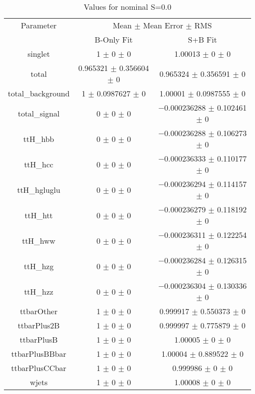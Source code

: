 \begin{table}
\centering
\caption{Values for nominal S=0.0}
\begin{tabular}{ccc}
\toprule
Parameter & \multicolumn{2}{c}{Mean $\pm$ Mean Error $\pm$ RMS}\\
 & B-Only Fit & S+B Fit\\
\midrule
singlet & \num{1} $\pm$ \num{0} $\pm$ \num{0} & \num{1.00013} $\pm$ \num{0} $\pm$ \num{0}\\
total & \num{0.965321} $\pm$ \num{0.356604} $\pm$ \num{0} & \num{0.965324} $\pm$ \num{0.356591} $\pm$ \num{0}\\
total\_background & \num{1} $\pm$ \num{0.0987627} $\pm$ \num{0} & \num{1.00001} $\pm$ \num{0.0987555} $\pm$ \num{0}\\
total\_signal & \num{0} $\pm$ \num{0} $\pm$ \num{0} & \num{-0.000236288} $\pm$ \num{0.102461} $\pm$ \num{0}\\
ttH\_hbb & \num{0} $\pm$ \num{0} $\pm$ \num{0} & \num{-0.000236288} $\pm$ \num{0.106273} $\pm$ \num{0}\\
ttH\_hcc & \num{0} $\pm$ \num{0} $\pm$ \num{0} & \num{-0.000236333} $\pm$ \num{0.110177} $\pm$ \num{0}\\
ttH\_hgluglu & \num{0} $\pm$ \num{0} $\pm$ \num{0} & \num{-0.000236294} $\pm$ \num{0.114157} $\pm$ \num{0}\\
ttH\_htt & \num{0} $\pm$ \num{0} $\pm$ \num{0} & \num{-0.000236279} $\pm$ \num{0.118192} $\pm$ \num{0}\\
ttH\_hww & \num{0} $\pm$ \num{0} $\pm$ \num{0} & \num{-0.000236311} $\pm$ \num{0.122254} $\pm$ \num{0}\\
ttH\_hzg & \num{0} $\pm$ \num{0} $\pm$ \num{0} & \num{-0.000236284} $\pm$ \num{0.126315} $\pm$ \num{0}\\
ttH\_hzz & \num{0} $\pm$ \num{0} $\pm$ \num{0} & \num{-0.000236304} $\pm$ \num{0.130336} $\pm$ \num{0}\\
ttbarOther & \num{1} $\pm$ \num{0} $\pm$ \num{0} & \num{0.999917} $\pm$ \num{0.550373} $\pm$ \num{0}\\
ttbarPlus2B & \num{1} $\pm$ \num{0} $\pm$ \num{0} & \num{0.999997} $\pm$ \num{0.775879} $\pm$ \num{0}\\
ttbarPlusB & \num{1} $\pm$ \num{0} $\pm$ \num{0} & \num{1.00005} $\pm$ \num{0} $\pm$ \num{0}\\
ttbarPlusBBbar & \num{1} $\pm$ \num{0} $\pm$ \num{0} & \num{1.00004} $\pm$ \num{0.889522} $\pm$ \num{0}\\
ttbarPlusCCbar & \num{1} $\pm$ \num{0} $\pm$ \num{0} & \num{0.999986} $\pm$ \num{0} $\pm$ \num{0}\\
wjets & \num{1} $\pm$ \num{0} $\pm$ \num{0} & \num{1.00008} $\pm$ \num{0} $\pm$ \num{0}\\
\bottomrule
\end{tabular}
\end{table}